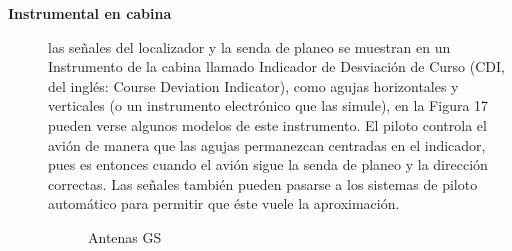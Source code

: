 \begin{description}
\item [\bf Instrumental en cabina]  las señales del localizador y la senda de planeo se muestran
  en un Instrumento de la cabina llamado Indicador de Desviación de Curso (CDI, del inglés: Course
Deviation Indicator), como agujas horizontales y verticales (o un instrumento electrónico que las
simule), en la Figura 17 pueden verse algunos modelos de este instrumento. El piloto controla
el avión de manera que las agujas permanezcan centradas en el indicador, pues es entonces
cuando el avión sigue la senda de planeo y la dirección correctas. Las señales también pueden
pasarse a los sistemas de piloto automático para permitir que éste vuele la aproximación.


\begin{figure}[!htb]
  \centering

  
  \caption{Antenas GS}
  \label{fig:06.ILS.GS}
\end{figure}
  
\end{description}

